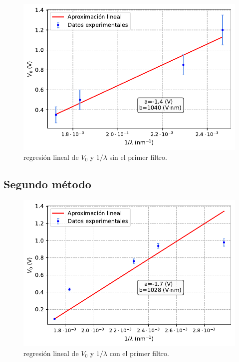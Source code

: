 \documentclass[12pt,a4paper]{article}
\numberwithin{equation}{section}
\numberwithin{table}{section}
\numberwithin{figure}{section}
\begin{document}
\begin{figure}[h!]  \centering
\includegraphics[scale=0.97]{Metodo_1-sin.pdf}
\caption{regresión lineal de $V_0$ y $1/\lambda$ sin el primer filtro.}
\label{Fig:6.3.2}
\end{figure}

\newpage
\subsection{Segundo método}

\begin{figure}[h!]  \centering
\includegraphics[scale=0.97]{Metodo_2-con.pdf}
\caption{regresión lineal de $V_0$ y $1/\lambda$ con el primer filtro.}
\label{Fig:6.4.1}
\end{figure}
\end{document}
